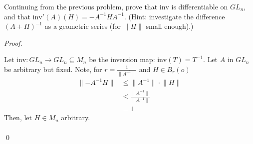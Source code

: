 \documentclass[12pt]{article}
\newenvironment{problem}[2][Problem]{\begin{trivlist}
\item[\hskip \labelsep {\bfseries #1}\hskip \labelsep {\bfseries
#2.}]}{\end{trivlist}}
\newenvironment{sol}
    {\emph{Proof.}
    }
    {
    \qed
    }
\begin{document}
  
  \begin{problem}{16}
  Continuing from the previous problem, prove that $\text{inv}$ is differentiable on $GL_n$, and that $\text{inv}'(A)(H) = -A^{-1}HA^{-1}$. (Hint: investigate the difference $(A + H)^{-1}$ as a geometric series (for $\lVert H \rVert$ small enough).)
  \end{problem}
  \begin{sol}
  Let $\text{inv} : GL_n \to GL_n \subseteq M_n$ be the inversion map: $\text{inv}(T) = T^{-1}$. Let $A$ in $GL_n$ be arbitrary but fixed. Note, for $r = \frac{1}{\lVert A^{-1} \rVert}$ and $H \in B_r(o)$ \begin{align*}
      \lVert -A^{-1}H \rVert &\leq \lVert A^{-1} \rVert \cdot \lVert H \rVert \tag*{(By triangle inequality)} \\ &< \frac{\lVert A^{-1} \rVert}{\lVert A^{-1} \rVert} \tag*{(Since $H$ in $B_r(0)$)} \\ &= 1
  \end{align*} 
      Then, let $H \in M_n$ arbitrary.  \begin{align*}

\end{align*}
\end{sol}
\end{document}
